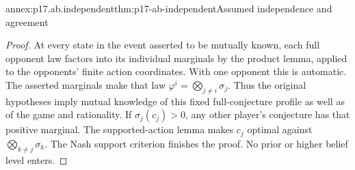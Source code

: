 \begin{annexitem}{annex:p17.ab.independent}{thm:p17-ab-independent}{Assumed independence and agreement}
\begin{proof}
At every state in the event asserted to be mutually known,
each full opponent law factors into its individual marginals
by the product lemma, applied to the opponents' finite
action coordinates. With one opponent this is automatic.
The asserted marginals make that law
\(\varphi^i=\bigotimes_{j\ne i}\sigma_j\).
Thus the original hypotheses imply mutual knowledge of this
fixed full-conjecture profile as well as of the game and
rationality. If \(\sigma_j(c_j)>0\), any other player's
conjecture has that positive marginal. The supported-action
lemma makes \(c_j\) optimal against
\(\bigotimes_{k\ne j}\sigma_k\). The Nash support criterion
finishes the proof. No prior or higher belief level enters.
\end{proof}
\end{annexitem}

